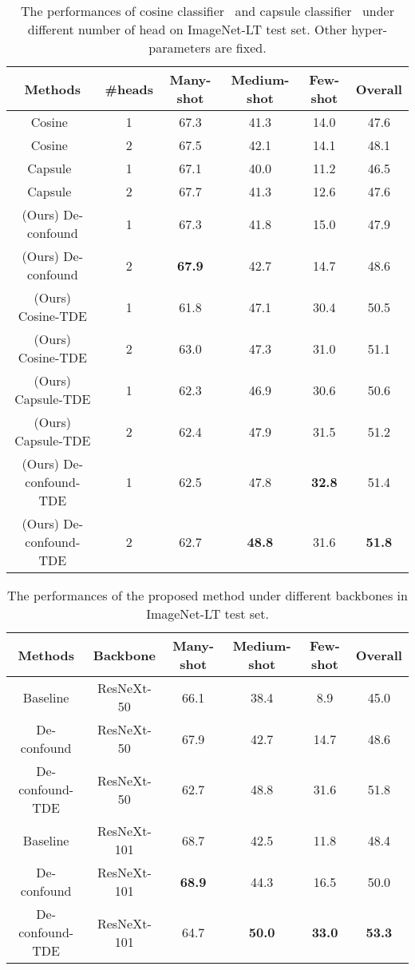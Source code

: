 \documentclass{article}
\begin{document}
\begin{table}
\centering
{
\begin{tabular}{c |c |c |c |c |c }
\hline
\hline
Methods & \#heads  & Many-shot & Medium-shot & Few-shot & Overall \\ 
\hline
Cosine~\cite{gidaris2018dynamic, qi2018low} & 1 & 67.3 & 41.3 & 14.0 & 47.6 \\
Cosine~\cite{gidaris2018dynamic, qi2018low} & 2 & 67.5 & 42.1 & 14.1 & 48.1 \\
Capsule~\cite{liu2019large, sabour2017dynamic} & 1 & 67.1 & 40.0 & 11.2 & 46.5 \\
Capsule~\cite{liu2019large, sabour2017dynamic} & 2 & 67.7 & 41.3 & 12.6 & 47.6 \\
(Ours) De-confound & 1 & 67.3 & 41.8 & 15.0 & 47.9 \\
(Ours) De-confound & 2 & \textbf{67.9} & 42.7 & 14.7 & 48.6 \\
(Ours) Cosine-TDE & 1 & 61.8 & 47.1 & 30.4 & 50.5 \\
(Ours) Cosine-TDE & 2 & 63.0 & 47.3 & 31.0 & 51.1 \\
(Ours) Capsule-TDE & 1 & 62.3 & 46.9 & 30.6 & 50.6 \\
(Ours) Capsule-TDE & 2 & 62.4 & 47.9 & 31.5 & 51.2 \\
(Ours) De-confound-TDE & 1 & 62.5 & 47.8 & \textbf{32.8} & 51.4 \\
(Ours) De-confound-TDE & 2 & 62.7 & \textbf{48.8} & 31.6 & \textbf{51.8} \\
\hline
\hline
\end{tabular}
}
\caption{The performances of cosine classifier~\cite{gidaris2018dynamic, qi2018low} and capsule classifier~\cite{liu2019large, sabour2017dynamic} under different number of head  on ImageNet-LT test set. Other hyper-parameters are fixed. }
\label{sp-tab:3}
\end{table}


\begin{table}
\centering
{
\begin{tabular}{c |c |c |c |c |c }
\hline
\hline
Methods & Backbone & Many-shot & Medium-shot & Few-shot & Overall \\ 
\hline
Baseline & ResNeXt-50 & 66.1 & 38.4 & 8.9 & 45.0 \\
De-confound & ResNeXt-50 & 67.9 & 42.7 & 14.7 & 48.6 \\
De-confound-TDE & ResNeXt-50 & 62.7 & 48.8 & 31.6 & 51.8 \\
\hline 
Baseline & ResNeXt-101 & 68.7 & 42.5 & 11.8 & 48.4 \\
De-confound & ResNeXt-101 & \textbf{68.9} & 44.3 & 16.5 & 50.0 \\
De-confound-TDE & ResNeXt-101 & 64.7 & \textbf{50.0} & \textbf{33.0} & \textbf{53.3} \\
\hline
\hline
\end{tabular}
}
\caption{The performances of the proposed method under different backbones in ImageNet-LT test set.}
\label{sp-tab:4}
\end{table}
\end{document}
